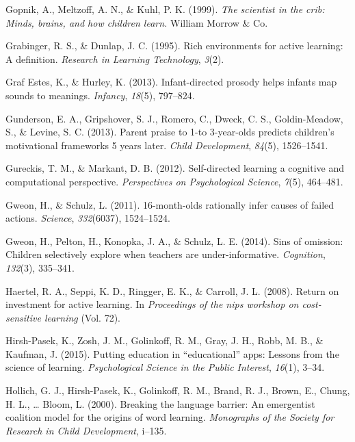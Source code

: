 \documentclass[english,floatsintext,man]{apa6}
\theoremstyle{definition}
\theoremstyle{definition}
\theoremstyle{definition}
\theoremstyle{remark}
\begin{document}
\hypertarget{ref-gopnik1999scientist}{}
Gopnik, A., Meltzoff, A. N., \& Kuhl, P. K. (1999). \emph{The scientist
in the crib: Minds, brains, and how children learn.} William Morrow \&
Co.

\hypertarget{ref-grabinger1995rich}{}
Grabinger, R. S., \& Dunlap, J. C. (1995). Rich environments for active
learning: A definition. \emph{Research in Learning Technology},
\emph{3}(2).

\hypertarget{ref-graf2013infant}{}
Graf Estes, K., \& Hurley, K. (2013). Infant-directed prosody helps
infants map sounds to meanings. \emph{Infancy}, \emph{18}(5), 797--824.

\hypertarget{ref-gunderson2013parent}{}
Gunderson, E. A., Gripshover, S. J., Romero, C., Dweck, C. S.,
Goldin-Meadow, S., \& Levine, S. C. (2013). Parent praise to 1-to
3-year-olds predicts children's motivational frameworks 5 years later.
\emph{Child Development}, \emph{84}(5), 1526--1541.

\hypertarget{ref-gureckis2012self}{}
Gureckis, T. M., \& Markant, D. B. (2012). Self-directed learning a
cognitive and computational perspective. \emph{Perspectives on
Psychological Science}, \emph{7}(5), 464--481.

\hypertarget{ref-gweon201116}{}
Gweon, H., \& Schulz, L. (2011). 16-month-olds rationally infer causes
of failed actions. \emph{Science}, \emph{332}(6037), 1524--1524.

\hypertarget{ref-gweon2014sins}{}
Gweon, H., Pelton, H., Konopka, J. A., \& Schulz, L. E. (2014). Sins of
omission: Children selectively explore when teachers are
under-informative. \emph{Cognition}, \emph{132}(3), 335--341.

\hypertarget{ref-haertel2008return}{}
Haertel, R. A., Seppi, K. D., Ringger, E. K., \& Carroll, J. L. (2008).
Return on investment for active learning. In \emph{Proceedings of the
nips workshop on cost-sensitive learning} (Vol. 72).

\hypertarget{ref-hirsh2015putting}{}
Hirsh-Pasek, K., Zosh, J. M., Golinkoff, R. M., Gray, J. H., Robb, M.
B., \& Kaufman, J. (2015). Putting education in ``educational'' apps:
Lessons from the science of learning. \emph{Psychological Science in the
Public Interest}, \emph{16}(1), 3--34.

\hypertarget{ref-hollich2000breaking}{}
Hollich, G. J., Hirsh-Pasek, K., Golinkoff, R. M., Brand, R. J., Brown,
E., Chung, H. L., \ldots{} Bloom, L. (2000). Breaking the language
barrier: An emergentist coalition model for the origins of word
learning. \emph{Monographs of the Society for Research in Child
Development}, i--135.
\end{document}
